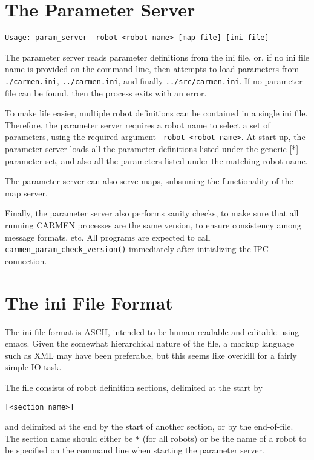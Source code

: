 \documentclass{article}
\begin{document}
\section{The Parameter Server}

\begin{verbatim}
Usage: param_server -robot <robot name> [map file] [ini file]
\end{verbatim}

The parameter server reads parameter definitions from the ini file, or, if no
ini file name is provided on the command line, then attempts to load
parameters from \verb!./carmen.ini!, \verb!../carmen.ini!, and finally
\verb!../src/carmen.ini!. If no parameter file can be found, then the process
exits with an error. 

To make life easier, multiple robot definitions can be contained in a single
ini file. Therefore, the parameter server requires a robot name to select a
set of parameters, using the required argument \verb!-robot <robot name>!. At
start up, the parameter server loads all the parameter definitions listed
under the generic [*] parameter set, and also all the parameters listed under
the matching robot name. 

The parameter server can also serve maps, subsuming the functionality of the
map server. 

Finally, the parameter server also performs sanity checks, to make sure that
all running CARMEN processes are the same version, to ensure consistency among
message formats, etc. All programs are expected to call
\verb!carmen_param_check_version()! immediately after initializing the IPC
connection. 

\section{The ini File Format}

The ini file format is ASCII, intended to be human readable and editable using
emacs. Given the somewhat hierarchical nature of the file, a markup language
such as XML may have been preferable, but this seems like overkill for a
fairly simple IO task.

The file consists of robot definition sections, delimited at the start by
\begin{verbatim}
[<section name>]
\end{verbatim}
and delimited at the end by the start of another section, or by the
end-of-file. The section name should either be \verb!*! (for all robots) or be
the name of a robot to be specified on the command line when starting the
parameter server.
\end{document}
